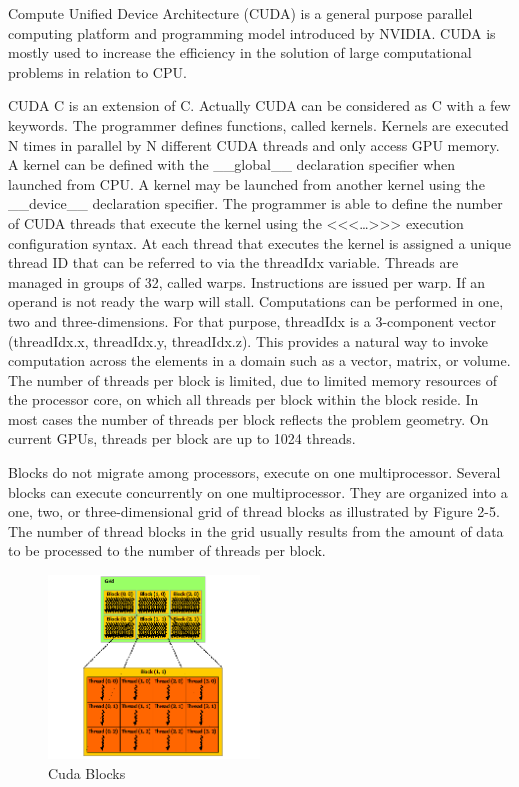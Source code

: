 Compute Unified Device Architecture (CUDA) is a general purpose parallel computing platform and programming model introduced by NVIDIA. CUDA is mostly used to increase the efficiency in the solution of large computational problems in relation to CPU.

CUDA C is an extension of C. Actually CUDA can be considered as C with a few keywords. The programmer defines functions, called kernels. Kernels are executed N times in parallel by N different CUDA threads and only access GPU memory. A kernel can be defined with the \_\_global\_\_ declaration specifier when launched from CPU. A kernel may be launched from another kernel using the \_\_device\_\_ declaration specifier. The programmer is able to define the number of CUDA threads that execute the kernel using the <<<…>>> execution configuration syntax. At each thread that executes the kernel is assigned a unique thread ID that can be referred to via the threadIdx variable. Threads are managed in groups of 32, called warps. Instructions are issued per warp. If an operand is not ready the warp will stall. Computations can be performed in one, two and three-dimensions. For that purpose, threadIdx is a 3-component vector (threadIdx.x, threadIdx.y, threadIdx.z). This provides a natural way to invoke computation across the elements in a domain such as a vector, matrix, or volume. The number of threads per block is limited, due to limited memory resources of the processor core, on which all threads per block within the block reside. In most cases the number of threads per block reflects the problem geometry. On current GPUs, threads per block are up to 1024 threads. 

Blocks do not migrate among processors, execute on one multiprocessor. Several blocks can execute concurrently on one multiprocessor. They are organized into a one, two, or three-dimensional grid of thread blocks as illustrated by Figure 2-5. The number of thread blocks in the grid usually results from the amount of data to be processed to the number of threads per block. 

\begin{figure}[H]
   \centering
       \includegraphics[width=0.5\textwidth]{blocks}
   \caption{Cuda Blocks}
   \label{fig:Blocks}
\end{figure}

